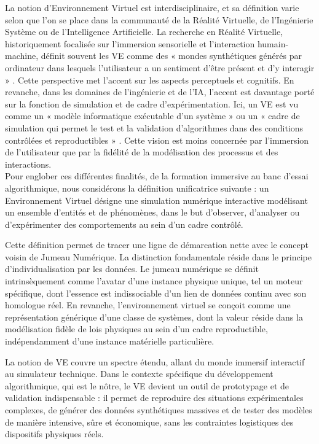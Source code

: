 La notion d'Environnement Virtuel est interdisciplinaire, et sa définition varie selon que l'on se place dans la communauté de la Réalité Virtuelle, de l'Ingénierie Système ou de l'Intelligence Artificielle. La recherche en Réalité Virtuelle, historiquement focalisée sur l'immersion sensorielle et l'interaction humain-machine, définit souvent les VE comme des « mondes synthétiques générés par ordinateur dans lesquels l'utilisateur a un sentiment d'être présent et d'y interagir » \cite{sherman_understanding_2018}. Cette perspective met l'accent sur les aspects perceptuels et cognitifs. En revanche, dans les domaines de l'ingénierie et de l'IA, l'accent est davantage porté sur la fonction de simulation et de cadre d'expérimentation. Ici, un VE est vu comme un « modèle informatique exécutable d'un système » \cite{fritzson_principles_2015} ou un « cadre de simulation qui permet le test et la validation d'algorithmes dans des conditions contrôlées et reproductibles » \cite{brockman_openai_2016}. Cette vision est moins concernée par l'immersion de l'utilisateur que par la fidélité de la modélisation des processus et des interactions.\\

Pour englober ces différentes finalités, de la formation immersive au banc d'essai algorithmique, nous considérons la définition unificatrice suivante : un Environnement Virtuel désigne une simulation numérique interactive modélisant un ensemble d'entités et de phénomènes, dans le but d'observer, d'analyser ou d'expérimenter des comportements au sein d'un cadre contrôlé.

Cette définition permet de tracer une ligne de démarcation nette avec le concept voisin de Jumeau Numérique. La distinction fondamentale réside dans le principe d'individualisation par les données. Le jumeau numérique se définit intrinsèquement comme l'avatar d'une instance physique unique, tel un moteur spécifique, dont l'essence est indissociable d'un lien de données continu avec son homologue réel. En revanche, l'environnement virtuel se conçoit comme une représentation générique d'une classe de systèmes, dont la valeur réside dans la modélisation fidèle de lois physiques au sein d'un cadre reproductible, indépendamment d'une instance matérielle particulière.

La notion de VE couvre un spectre étendu, allant du monde immersif interactif au simulateur technique. Dans le contexte spécifique du développement algorithmique, qui est le nôtre, le VE devient un outil de prototypage et de validation indispensable : il permet de reproduire des situations expérimentales complexes, de générer des données synthétiques massives et de tester des modèles de manière intensive, sûre et économique, sans les contraintes logistiques des dispositifs physiques réels. 

